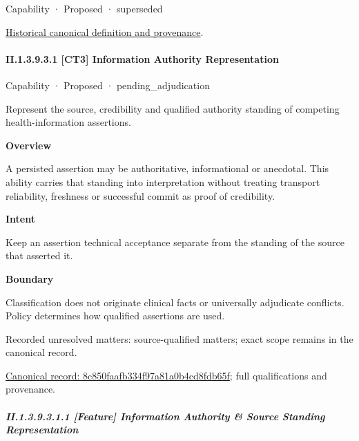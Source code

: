 \label{element:3811c758ff2140c39a801bf89f75098a}
{\small Capability · Proposed · superseded}\par
\href{../../../../../../../continuum/strategy/capability/3811c758ff2140c39a801bf89f75098a.md}{Historical canonical definition and provenance}.\par
\paragraph*{II.1.3.9.3.1 [CT3] Information Authority Representation}
\label{navigation:II.1.3.9.3.1}

\label{element:8c850faafb334f97a81a0b4cd8fdb65f}
{\small Capability · Proposed · pending\_adjudication}\par

Represent the source, credibility and qualified authority standing of competing health-information assertions.



\textbf{Overview}



A persisted assertion may be authoritative, informational or anecdotal. This ability carries that standing into interpretation without treating transport reliability, freshness or successful commit as proof of credibility.



\textbf{Intent}



Keep an assertion technical acceptance separate from the standing of the source that asserted it.



\textbf{Boundary}



Classification does not originate clinical facts or universally adjudicate conflicts. Policy determines how qualified assertions are used.


{\small Recorded unresolved matters: source-qualified matters; exact scope remains in the canonical record.}\par
{\footnotesize \href{../../../../../../../continuum/strategy/capability/8c850faafb334f97a81a0b4cd8fdb65f.md}{Canonical record: 8c850faafb334f97a81a0b4cd8fdb65f}; full qualifications and provenance.}\par
\subparagraph*{II.1.3.9.3.1.1 [Feature] Information Authority \& Source Standing Representation}
\label{navigation:II.1.3.9.3.1.1}

